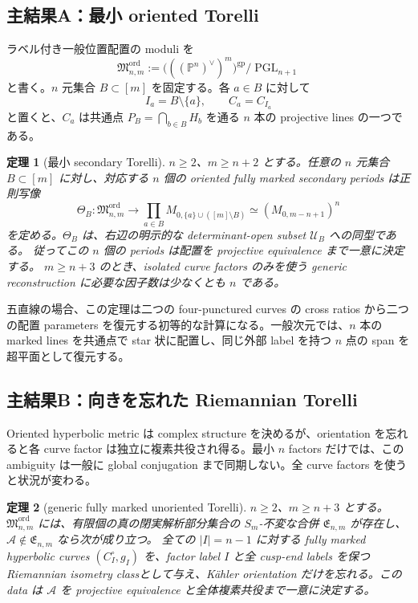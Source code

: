 \documentclass[11pt,a4paper]{ltjsarticle}
\newcommand{\PP}{\mathbb P}
\newcommand{\cA}{\mathcal A}
\newcommand{\cU}{\mathcal U}
\newcommand{\Mord}{\mathfrak M^{\mathrm{ord}}}
\theoremstyle{plain}
\newtheorem{theorem}{定理}[section]
\theoremstyle{definition}
\theoremstyle{remark}
\begin{document}
\subsection{主結果A：最小 oriented Torelli}
ラベル付き一般位置配置の moduli を
\[
 \Mord_{n,m}
 :=\bigl(((\PP^n)^\vee)^m\bigr)^{\mathrm{gp}}/\operatorname{PGL}_{n+1}
\]
と書く。$n$ 元集合 $B\subset[m]$ を固定する。各 $a\in B$ に対して
\[
 I_a=B\setminus\{a\},\qquad C_a=C_{I_a}
\]
と置くと、$C_a$ は共通点 $P_B=\bigcap_{b\in B}H_b$ を通る $n$ 本の projective lines の一つである。

\begin{theorem}[最小 secondary Torelli]
\label{thm:intro-star}
$n\ge2$、$m\ge n+2$ とする。任意の $n$ 元集合 $B\subset[m]$ に対し、対応する $n$ 個の oriented fully marked secondary periods は正則写像
\[
 \Theta_B:\Mord_{n,m}\longrightarrow
 \prod_{a\in B}M_{0,\{a\}\cup([m]\setminus B)}
 \simeq(M_{0,m-n+1})^n
\]
を定める。$\Theta_B$ は、右辺の明示的な determinant-open subset $\cU_B$ への同型である。
従ってこの $n$ 個の periods は配置を projective equivalence まで一意に決定する。
$m\ge n+3$ のとき、isolated curve factors のみを使う generic reconstruction に必要な因子数は少なくとも $n$ である。
\end{theorem}

五直線の場合、この定理は二つの four-punctured curves の cross ratios から二つの配置 parameters を復元する初等的な計算になる。一般次元では、$n$ 本の marked lines を共通点で star 状に配置し、同じ外部 label を持つ $n$ 点の span を超平面として復元する。

\subsection{主結果B：向きを忘れた Riemannian Torelli}
Oriented hyperbolic metric は complex structure を決めるが、orientation を忘れると各 curve factor は独立に複素共役され得る。最小 $n$ factors だけでは、この ambiguity は一般に global conjugation まで同期しない。全 curve factors を使うと状況が変わる。

\begin{theorem}[generic fully marked unoriented Torelli]
\label{thm:intro-unoriented}
$n\ge2$、$m\ge n+3$ とする。$\Mord_{n,m}$ には、有限個の真の閉実解析部分集合の $S_m$-不変な合併 $\mathfrak E_{n,m}$ が存在し、$\cA\notin\mathfrak E_{n,m}$ なら次が成り立つ。
全ての $|I|=n-1$ に対する fully marked hyperbolic curves $(C_I^\circ,g_I)$ を、factor label $I$ と全 cusp-end labels を保つ Riemannian isometry classとして与え、K\"ahler orientation だけを忘れる。この data は $\cA$ を projective equivalence と全体複素共役まで一意に決定する。
\end{theorem}
\end{document}

